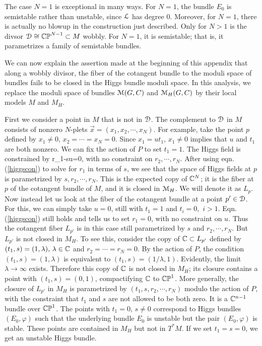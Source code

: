 \documentclass[11pt,a4paper]{article}
\begin{document}
  The case $N=1$ is exceptional in many ways.  
For $N=1$, the bundle $E_0$ is semistable rather than unstable, since ${\mathcal L}$ has degree 0.  Moreover, for $N=1$, there is actually no blowup
in the construction just described.  Only for  $N>1$ is  the divsor
${\mathcal D}\cong {\mathbb{CP}}^{N-1}\subset M$  wobbly.    For $N=1$, it is semistable; that is, it parametrizes a family of semistable bundles.

 We can now explain the assertion made at the beginning of this appendix that along a wobbly
divisor, the fiber of the cotangent bundle to the moduli space of bundles fails to be closed in the Higgs bundle moduli space.  In this analysis, we
replace the moduli space of bundles ${\mathcal M}(G,C)$ and ${\mathcal M}_H(G,C)$ by their local models $M$ and $M_H$.  

First we consider a point in $M$ that is not in ${\mathcal D}$.   The complement to ${\mathcal D}$ in $M$ consists of nonzero $N$-plets $\vec x=(x_1,x_2,\cdots, x_N)$.
For example, take the point $p$ defined by $x_1\not=0$, $x_2=\cdots= x_N=0$.    Since $x_1=ut_1$, $x_1\not=0$ 
 implies that $u$ and $t_1$ are both nonzero.  We can fix
the action of $P$ to set $t_1=1$.   The Higgs field is constrained by 
\be\label{higgscon} r_1-su=0, \ee
with no constraint on $r_2,\cdots, r_N$.   After using eqn. (\ref{higgscon}) to solve for $r_1$ in terms of $s$, we see that the space of Higgs fields
at $p$ is parametrized by $s,r_2, \cdots, r_N$.   This is the expected copy of ${\mathbb C}^N$; it  is the fiber at $p$ of the cotangent 
bundle of $M$, and it is closed in ${\mathcal M}_H$. We will denote it as $L_p$.   Now instead let us look at the
fiber of the cotangent bundle at a point $p'\in {\mathcal D}$.     For this, we can simply take $u=0$, still with $t_1=1$ and $t_i=0,$ $i>1$.   Eqn. (\ref{higgscon})
still holds and tells us to set $r_1=0$, with no constraint on $u$.    Thus the cotangent fiber $L_{p'}$ is in this case still parametrized
by $s$ and $r_2,\cdots, r_N$.    But $L_{p'}$ is not closed in $M_H$.   To see this, consider the copy of  ${\mathbb C}\subset L_{p'} $ defined by  $(t_1,s)=(1,\lambda),\,\lambda\in{\mathbb C}$
and $r_2=\cdots = r_N=0$.   By the action of $P$, the condition $(t_1,s)=(1,\lambda)$ is equivalent to $(t_1,s)=(1/\lambda,1)$.    
Evidently,  the limit $\lambda\to\infty$ exists.
Therefore this copy of ${\mathbb C}$ is not closed
in $M_H$; its closure contains a point with $(t_1,s)=(0,1)$, compactifying ${\mathbb C}$ to  ${\mathbb{CP}}^1$.   More generally, the closure of $L_{p'}$ in $M_H$
is parametrized by $(t_1,s,r_2,\cdots, r_N)$ modulo the action of $P$, with the constraint that $t_1$ and $s$ are not allowed to be both zero.  It is a ${\mathbb C}^{n-1}$
bundle over ${\mathbb{CP}}^1$.    The points
with $t_1=0$, $s\not=0$ correspond to Higgs bundles $(E_0,\varphi)$ such that the underlying bundle $E_0$ is unstable but the pair $(E_0,\varphi)$ is
stable.   These points are contained in $M_H$ but not in $T^*M$.   If we set $t_1=s=0$, we get an unstable Higgs bundle.
\end{document}
